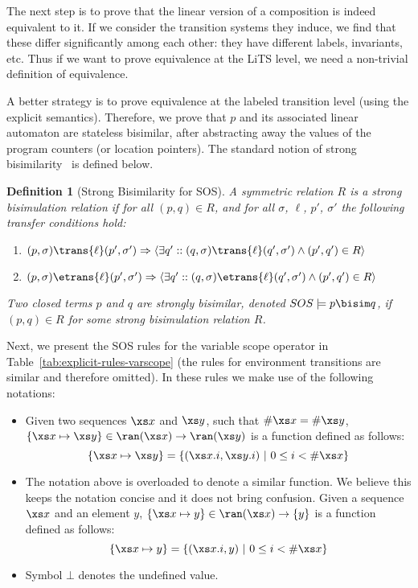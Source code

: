 \documentclass[submission,copyright,creativecommons,sharealike]{eptcs}
\newtheorem{definition}{Definition}
\begin{document}
The next step is to prove that the linear version of a composition is
indeed equivalent to it.
If we consider the transition systems they induce, we find that these
differ significantly among each other: they have different labels,
invariants, etc. Thus if we want to prove equivalence at the LiTS
level, we need a non-trivial definition of equivalence.

A better strategy is to prove equivalence at the labeled transition
level (using the explicit semantics).
Therefore, we prove that $p$ and its associated linear automaton
are stateless bisimilar, after abstracting away the values of the
program counters (or location pointers).
The standard notion of strong
bisimilarity~\cite{MousaviRenGro:CongrSOSdataArtInfComp05} is defined
below.

\begin{definition}[Strong Bisimilarity for SOS]
  A symmetric relation $R$ is a strong bisimulation relation if for
  all $(p, q) \in R$, and for all $\sigma$, $\ell$, $p'$, $\sigma'$
  the following transfer conditions hold:
  \begin{enumerate}
  \item $(p, \sigma) \trans{\ell} (p', \sigma') \Rightarrow \langle
    \exists q' :: (q, \sigma) \trans{\ell} (q', \sigma') \wedge (p',
    q') \in R \rangle$
  \item $(p, \sigma) \etrans{\ell} (p', \sigma') \Rightarrow \langle
    \exists q' :: (q, \sigma) \etrans{\ell} (q', \sigma') \wedge (p',
    q') \in R \rangle$
  \end{enumerate}
  Two closed terms $p$ and $q$ are strongly bisimilar, denoted $SOS \models p
  \bisim q$, if $(p,q) \in R$ for some strong bisimulation relation
  $R$.
\end{definition}

Next, we present the SOS rules for the variable scope operator in
Table~\ref{tab:explicit-rules-varscope} (the rules for environment
transitions are similar and therefore omitted). In these rules we make
use of the following notations:
\begin{itemize}
\item Given two sequences $\xs x$ and $\xs y$, such that $\# \xs x =
  \# \xs y$, $\{ \xs x \mapsto \xs y\} \in \ran(\xs x) \rightarrow
  \ran(\xs y)$ is a function defined as follows:
  \begin{equation*}
    \{ \xs x \mapsto \xs y\} = \{ (\xs x {.} i, \xs y {.} i) \ |\
    0 \leq i < \# \xs x\}
  \end{equation*}
\item The notation above is overloaded to denote a similar function.
  We believe this keeps the notation concise and it does not bring
  confusion. Given a sequence $\xs x$ and an element $y$, $\{ \xs x
  \mapsto y\} \in \ran(\xs x) \rightarrow \{ y\}$ is a function
  defined as follows:
  \begin{equation*}
    \{ \xs x \mapsto y\} = \{ (\xs x {.} i,  y) \ |\
    0 \leq i < \# \xs x\}
  \end{equation*}
\item Symbol $\bot$ denotes the undefined value.
\end{itemize}
\end{document}
